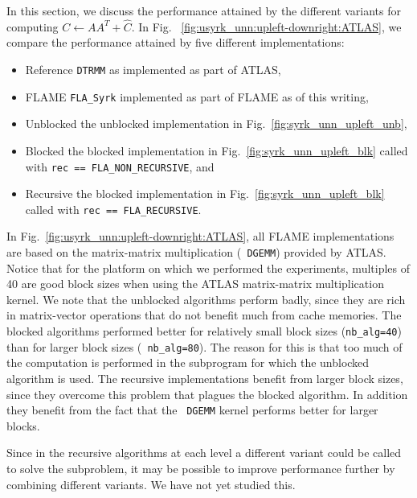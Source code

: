 In this section, we discuss the performance attained by the different
variants for computing $ C \leftarrow A A^T +  \hat{C} $.  In Fig.
~\ref{fig:usyrk_unn:upleft-downright:ATLAS}, we compare the performance
attained by five different implementations:
\begin{itemize}
\item{\sc Reference}
{\tt DTRMM} as implemented as part of ATLAS,
\item{\sc FLAME}
{\tt FLA\_Syrk} implemented as part of FLAME
as of this writing,
\item{\sc Unblocked}
the unblocked implementation in Fig.~\ref{fig:syrk_unn_upleft_unb},
\item{\sc Blocked}
the blocked implementation in Fig.~\ref{fig:syrk_unn_upleft_blk}
called with 
{\tt rec == 
%
FLA\_NON\_RECURSIVE}, and
\item{\sc Recursive}
the blocked implementation in Fig.~\ref{fig:syrk_unn_upleft_blk}
called with 
{\tt rec == 
%
FLA\_RECURSIVE}.
\end{itemize}
In Fig.~\ref{fig:usyrk_unn:upleft-downright:ATLAS}, all FLAME
implementations are based on the matrix-matrix multiplication ({\tt
DGEMM}) provided by ATLAS.  Notice that for the platform on which we
performed the experiments, multiples of 40 are good block sizes when
using the ATLAS matrix-matrix multiplication kernel.  We note that the
unblocked algorithms perform badly, since they are rich in
matrix-vector operations that do not benefit much from cache memories.
The blocked algorithms performed better for relatively small block
sizes ({\tt nb\_alg=40}) than for larger block sizes ({\tt
nb\_alg=80}).  The reason for this is that too much of the
computation is performed in the subprogram for which the unblocked
algorithm is used.  The recursive implementations benefit from larger
block sizes, since they overcome this problem that plagues the blocked
algorithm.  In addition they benefit from the fact that the {\tt
DGEMM} kernel performs better for larger blocks.

Since in the recursive algorithms at each level a different variant
could be called to solve the subproblem, it may be possible to improve
performance further by combining different variants.  We have not yet
studied this.

